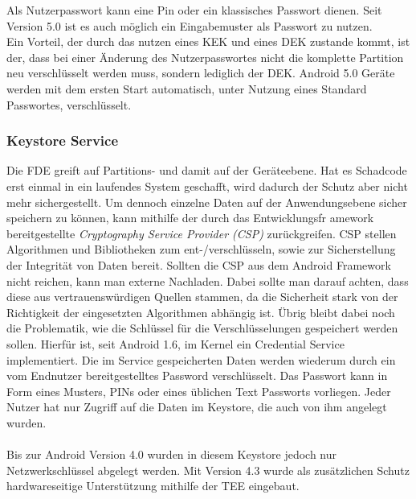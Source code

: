	Als Nutzerpasswort kann eine Pin oder ein klassisches Passwort dienen. Seit Version 5.0 ist es auch möglich ein Eingabemuster als Passwort zu nutzen. \\
	Ein Vorteil, der durch das nutzen eines KEK und eines DEK zustande kommt, ist der, dass bei einer Änderung des Nutzerpasswortes nicht die komplette Partition neu verschlüsselt werden muss, sondern lediglich der DEK. Android 5.0 Geräte werden mit dem ersten Start automatisch, unter Nutzung eines Standard Passwortes, verschlüsselt. 
	
	\subsubsection{Keystore Service}
	Die FDE greift auf Partitions- und damit auf der Geräteebene. Hat es Schadcode erst einmal in ein laufendes System geschafft, wird dadurch der Schutz aber nicht mehr sichergestellt. Um dennoch einzelne Daten auf der Anwendungsebene sicher speichern zu können, kann mithilfe der durch das Entwicklungsfr amework bereitgestellte \textit{Cryptography Service Provider (CSP)} zurückgreifen. CSP stellen Algorithmen und Bibliotheken zum ent-/verschlüsseln, sowie zur Sicherstellung der Integrität von Daten bereit. Sollten die CSP aus dem Android Framework nicht reichen, kann man externe Nachladen. Dabei sollte man darauf achten, dass diese aus vertrauenswürdigen Quellen stammen, da die Sicherheit stark von der Richtigkeit der eingesetzten Algorithmen abhängig ist. Übrig bleibt dabei noch die Problematik, wie die Schlüssel für die Verschlüsselungen gespeichert werden sollen. Hierfür ist, seit Android 1.6, im Kernel ein Credential Service implementiert. Die im Service gespeicherten Daten werden wiederum durch ein vom Endnutzer bereitgestelltes Password verschlüsselt. Das Passwort kann in Form eines Musters, PINs oder eines üblichen Text Passworts vorliegen. Jeder Nutzer hat nur Zugriff auf die Daten im Keystore, die auch von ihm angelegt wurden.\\\\	
	Bis zur Android Version 4.0 wurden in diesem Keystore jedoch nur Netzwerkschlüssel abgelegt werden. Mit Version 4.3 wurde als zusätzlichen Schutz hardwareseitige Unterstützung mithilfe der TEE eingebaut.\cite[S. 175]{Drake2014}

